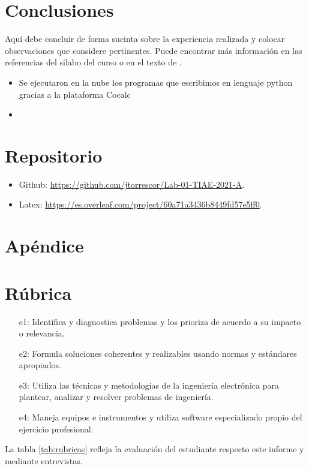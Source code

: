 \documentclass[12pt,oneside,spanish]{article}
\begin{document}
\section{Conclusiones}
Aquí debe concluir de forma sucinta sobre la experiencia realizada y colocar observaciones que considere pertinentes.
Puede encontrar más información en las referencias del silabo del curso o en el texto de \cite{fossen:2011}.

\begin{itemize}

    \item Se ejecutaron en la nube los programas que escribimos en lenguaje python gracias a la plataforma Cocalc
    \item 
    
\end{itemize}

\section{Repositorio}
\begin{itemize}
    \item Github: 
    \url{https://github.com/jtorrescor/Lab-01-TIAE-2021-A}.
    \item Latex: 
    \url{https://es.overleaf.com/project/60a71a3436b8449fd57e5ff0}.
\end{itemize}

\newpage
%


\appendix


\newpage
{} %
\section*{Apéndice}

\newpage
{} %
\section*{Rúbrica}
\begin{itemize}
\item[e1:] Identifica y diagnostica problemas y los prioriza de acuerdo a su impacto o relevancia.
\item[e2:] Formula soluciones coherentes y realizables usando normas y estándares apropiados.
\item[e3:] Utiliza las técnicas y metodologías de la ingeniería electrónica para plantear, analizar y resolver problemas de ingeniería.
\item[e4:] Maneja equipos e instrumentos y utiliza software especializado propio del ejercicio profesional.
\end{itemize}
La tabla \ref{tab:rubricas} refleja la evaluación del estudiante respecto este informe y mediante entrevistas. 
\end{document}
